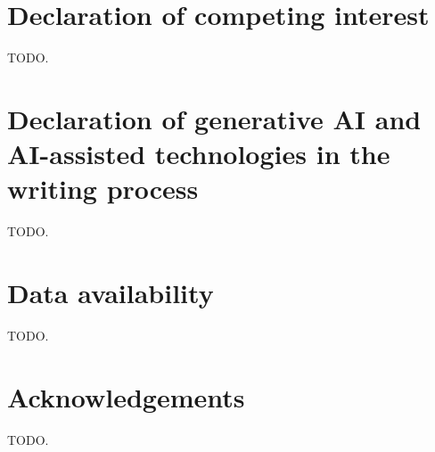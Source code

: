 \documentclass[preprint,12pt]{elsarticle}
\begin{document}
\section*{Declaration of competing interest}
TODO.

\section*{Declaration of generative AI and AI-assisted technologies in the writing process}
TODO.

\section*{Data availability}
TODO.

\section*{Acknowledgements}
TODO.



\end{document}
